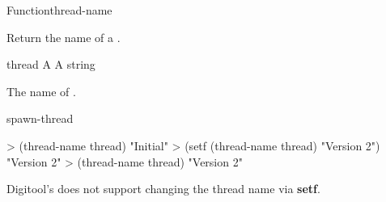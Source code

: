 \begin{functiondoc}{Function}{thread-name}{ 
   \returns{} } 

\fnsyntax

\fnpurpose Return the name of a .

\fnsetf
{}

\fnpackage {}

\fnmodule {}

\fnargs
\begin{args}{thread}
\arg[thread] A 
 A string
\end{args}

\fnreturns The name of .

\fnerrors
\nothreads{}

\begin{alsos}{spawn-thread}
\end{alsos}

\fnexamples
%
\W\supp
\begin{example}
> (thread-name thread)
"Initial"
> (setf (thread-name thread) "Version 2")
"Version 2"
> (thread-name thread)
"Version 2"
\end{example}

\fnnote Digitool's 
does not support changing the thread name via \textbf{setf}.

\end{functiondoc}


